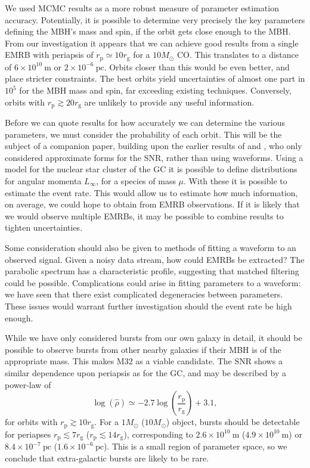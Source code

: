 \documentclass[useAMS,usedcolumn,usegraphicx,usenatbib]{mn2e}
\newcommand{\units}[1]{\ensuremath{~\mathrm{#1}}}
\newcommand{\sub}[1]{\ensuremath{_\mathrm{#1}}}
\begin{document}
We used MCMC results as a more robust measure of parameter estimation accuracy. Potentially, it is possible to determine very precisely the key parameters defining the MBH's mass and spin, if the orbit gets close enough to the MBH. From our investigation it appears that we can achieve good results from a single EMRB with periapsis of $r\sub{p} \simeq 10 r\sub{g}$ for a $10 M_\odot$ CO. This translates to a distance of $6 \times 10^{10}\units{m}$ or $2 \times 10^{-6}\units{pc}$. Orbits closer than this would be even better, and place stricter constraints. The best orbits yield uncertainties of almost one part in $10^5$ for the MBH mass and spin, far exceeding existing techniques. Conversely, orbits with $r\sub{p} \gtrsim 20 r\sub{g}$ are unlikely to provide any useful information.

Before we can quote results for how accurately we can determine the various parameters, we must consider the probability of each orbit. This will be the subject of a companion paper, building upon the earlier results of \citet{Rubbo2006} and \citet{Hopman2007}, who only considered approximate forms for the SNR, rather than using waveforms. Using a model for the nuclear star cluster of the GC it is possible to define distributions for angular momenta $L_\infty$, for a species of mass $\mu$. With these it is possible to estimate the event rate. This would allow us to estimate how much information, on average, we could hope to obtain from EMRB observations. If it is likely that we would observe multiple EMRBs, it may be possible to combine results to tighten uncertainties.

Some consideration should also be given to methods of fitting a waveform to an observed signal. Given a noisy data stream, how could EMRBs be extracted? The parabolic spectrum has a characteristic profile, suggesting that matched filtering could be possible. Complications could arise in fitting parameters to a waveform: we have seen that there exist complicated degeneracies between parameters. These issues would warrant further investigation should the event rate be high enough.

While we have only considered bursts from our own galaxy in detail, it should be possible to observe bursts from other nearby galaxies if their MBH is of the appropriate mass. This makes M32 as a viable candidate. The SNR shows a similar dependence upon periapsis as for the GC, and may be described by a power-law of
\begin{equation}
\log\left(\hat{\rho}\right) \simeq -2.7\log\left(\frac{r\sub{p}}{r\sub{g}}\right) + 3.1,
\end{equation}
for orbits with $r\sub{p} \gtrsim 10 r\sub{g}$. For a $1 M_\odot$ ($10 M_\odot$) object, bursts should be detectable for periapses $r\sub{p} \lesssim 7 r\sub{g}$ ($r\sub{p} \lesssim 14 r\sub{g}$), corresponding to $2.6 \times 10^{10}\units{m}$ ($4.9 \times 10^{10}\units{m}$) or $8.4 \times 10^{-7}\units{pc}$ ($1.6 \times 10^{-6}\units{pc}$). This is a small region of parameter space, so we conclude that extra-galactic bursts are likely to be rare.
\end{document}
